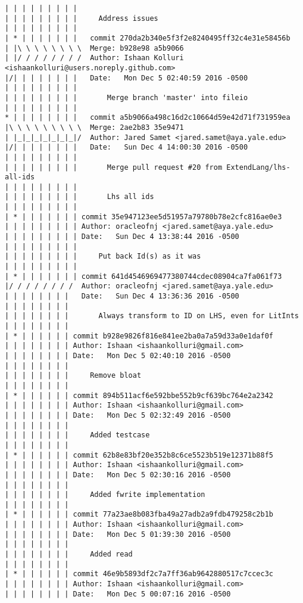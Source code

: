 \begin{lstlisting}
| | | | | | | | | 
| | | | | | | | |     Address issues
| | | | | | | | |            
| * | | | | | | |   commit 270da2b340e5f3f2e8240495ff32c4e31e58456b
| |\ \ \ \ \ \ \ \  Merge: b928e98 a5b9066
| |/ / / / / / / /  Author: Ishaan Kolluri <ishaankolluri@users.noreply.github.com>
|/| | | | | | | |   Date:   Mon Dec 5 02:40:59 2016 -0500
| | | | | | | | |   
| | | | | | | | |       Merge branch 'master' into fileio
| | | | | | | | |            
* | | | | | | | |   commit a5b9066a498c16d2c10664d59e42d71f731959ea
|\ \ \ \ \ \ \ \ \  Merge: 2ae2b83 35e9471
| |_|_|_|_|_|_|_|/  Author: Jared Samet <jared.samet@aya.yale.edu>
|/| | | | | | | |   Date:   Sun Dec 4 14:00:30 2016 -0500
| | | | | | | | |   
| | | | | | | | |       Merge pull request #20 from ExtendLang/lhs-all-ids
| | | | | | | | |       
| | | | | | | | |       Lhs all ids
| | | | | | | | |          
| * | | | | | | | commit 35e947123ee5d51957a79780b78e2cfc816ae0e3
| | | | | | | | | Author: oracleofnj <jared.samet@aya.yale.edu>
| | | | | | | | | Date:   Sun Dec 4 13:38:44 2016 -0500
| | | | | | | | | 
| | | | | | | | |     Put back Id(s) as it was
| | | | | | | | |          
| * | | | | | | | commit 641d4546969477380744cdec08904ca7fa061f73
|/ / / / / / / /  Author: oracleofnj <jared.samet@aya.yale.edu>
| | | | | | | |   Date:   Sun Dec 4 13:36:36 2016 -0500
| | | | | | | |   
| | | | | | | |       Always transform to ID on LHS, even for LitInts
| | | | | | | |         
| * | | | | | | commit b928e9826f816e841ee2ba0a7a59d33a0e1daf0f
| | | | | | | | Author: Ishaan <ishaankolluri@gmail.com>
| | | | | | | | Date:   Mon Dec 5 02:40:10 2016 -0500
| | | | | | | | 
| | | | | | | |     Remove bloat
| | | | | | | |         
| * | | | | | | commit 894b511acf6e592bbe552b9cf639bc764e2a2342
| | | | | | | | Author: Ishaan <ishaankolluri@gmail.com>
| | | | | | | | Date:   Mon Dec 5 02:32:49 2016 -0500
| | | | | | | | 
| | | | | | | |     Added testcase
| | | | | | | |         
| * | | | | | | commit 62b8e83bf20e352b8c6ce5523b519e12371b88f5
| | | | | | | | Author: Ishaan <ishaankolluri@gmail.com>
| | | | | | | | Date:   Mon Dec 5 02:30:16 2016 -0500
| | | | | | | | 
| | | | | | | |     Added fwrite implementation
| | | | | | | |         
| * | | | | | | commit 77a23ae8b083fba49a27adb2a9fdb479258c2b1b
| | | | | | | | Author: Ishaan <ishaankolluri@gmail.com>
| | | | | | | | Date:   Mon Dec 5 01:39:30 2016 -0500
| | | | | | | | 
| | | | | | | |     Added read
| | | | | | | |         
| * | | | | | | commit 46e9b5893df2c7a7ff36ab9642880517c7ccec3c
| | | | | | | | Author: Ishaan <ishaankolluri@gmail.com>
| | | | | | | | Date:   Mon Dec 5 00:07:16 2016 -0500

\end{lstlisting}
